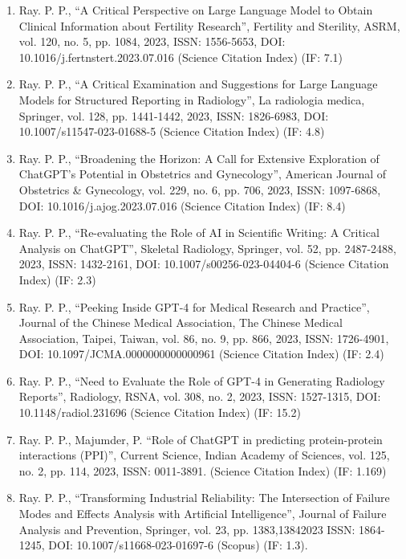 \documentclass[11pt,a4paper]{moderncv}
\begin{document}
\begin{adjustwidth}{6em}{0pt}
\begin{enumerate}
		\item Ray. P. P., “A Critical Perspective on Large Language Model to Obtain Clinical Information about Fertility Research”, Fertility and Sterility, ASRM, vol. 120, no. 5, pp. 1084, 2023, ISSN: 1556-5653, DOI: 10.1016/j.fertnstert.2023.07.016 (Science Citation Index) (IF: 7.1)
		
		\item Ray. P. P., “A Critical Examination and Suggestions for Large Language Models for Structured Reporting in Radiology”, La radiologia medica, Springer, vol. 128, pp. 1441-1442, 2023, ISSN: 1826-6983, DOI: 10.1007/s11547-023-01688-5 (Science Citation Index) (IF: 4.8)
		
		\item Ray. P. P., “Broadening the Horizon: A Call for Extensive Exploration of ChatGPT's Potential in Obstetrics and Gynecology”, American Journal of Obstetrics \& Gynecology, vol. 229, no. 6, pp. 706, 2023, ISSN: 1097-6868, DOI: 10.1016/j.ajog.2023.07.016 (Science Citation Index) (IF: 8.4)
		
		\item Ray. P. P., “Re-evaluating the Role of AI in Scientific Writing: A Critical Analysis on ChatGPT”, Skeletal Radiology, Springer, vol. 52, pp. 2487-2488, 2023, ISSN: 1432-2161, DOI: 10.1007/s00256-023-04404-6 (Science Citation Index) (IF: 2.3)
		
		\item Ray. P. P., “Peeking Inside GPT-4 for Medical Research and Practice”, Journal of the Chinese Medical Association, The Chinese Medical Association, Taipei, Taiwan, vol. 86, no. 9, pp. 866, 2023, ISSN: 1726-4901, DOI: 10.1097/JCMA.0000000000000961 (Science Citation Index) (IF: 2.4)
		
		\item Ray. P. P., “Need to Evaluate the Role of GPT-4 in Generating Radiology Reports”, Radiology, RSNA, vol. 308, no. 2, 2023, ISSN: 1527-1315, DOI: 10.1148/radiol.231696 (Science Citation Index) (IF: 15.2)
		
		\item Ray. P. P., Majumder, P. “Role of ChatGPT in predicting protein-protein interactions (PPI)”, Current Science, Indian Academy of Sciences, vol. 125, no. 2, pp. 114, 2023, ISSN: 0011-3891. (Science Citation Index) (IF: 1.169)
				
		\item Ray. P. P., “Transforming Industrial Reliability: The Intersection of Failure Modes and Effects Analysis with Artificial Intelligence”, Journal of Failure Analysis and Prevention, Springer, vol. 23, pp. 1383,13842023 ISSN: 1864-1245, DOI: 10.1007/s11668-023-01697-6 (Scopus) (IF: 1.3). 
		

\end{enumerate}
\end{adjustwidth}
\end{document}
